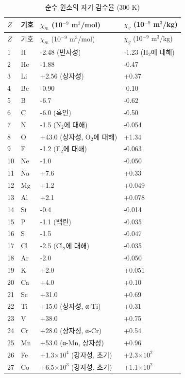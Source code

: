 \documentclass[12pt,a4paper]{article}
\begin{document}
	\begin{longtable}{p{0.6cm}p{1.2cm}p{2.5cm}p{2.5cm}}
		\caption{순수 원소의 자기 감수율 (300 K)} \label{tab:magnetic-susceptibility-all} \\
		\toprule
		\(Z\) & 기호 & \(\chi_m\) (10\(^{-9}\) m\(^3\)/mol) & \(\chi_g\) (10\(^{-9}\) m\(^3\)/kg) \\
		\midrule
		\endfirsthead
		\toprule
		\(Z\) & 기호 & \(\chi_m\) (10\(^{-9}\) m\(^3\)/mol) & \(\chi_g\) (10\(^{-9}\) m\(^3\)/kg) \\
		\midrule
		\endhead
		1  & H  & -2.48 (반자성) & -1.23 (H\(_2\)에 대해) \\
		2  & He & -1.88 & -0.47 \\
		3  & Li & +2.56 (상자성) & +0.37 \\
		4  & Be & -0.90 & -0.10 \\
		5  & B  & -6.7 & -0.62 \\
		6  & C  & -6.0 (흑연) & -0.50 \\
		7  & N  & -1.5 (N\(_2\)에 대해) & -0.054 \\
		8  & O  & +43.0 (상자성, O\(_2\)에 대해) & +1.34 \\
		9  & F  & -1.2 (F\(_2\)에 대해) & -0.063 \\
		10 & Ne & -1.0 & -0.050 \\
		11 & Na & +7.6 & +0.33 \\
		12 & Mg & +1.2 & +0.049 \\
		13 & Al & +2.1 & +0.078 \\
		14 & Si & -0.4 & -0.014 \\
		15 & P  & -1.1 (백린) & -0.035 \\
		16 & S  & -1.5 & -0.047 \\
		17 & Cl & -2.5 (Cl\(_2\)에 대해) & -0.035 \\
		18 & Ar & -2.0 & -0.050 \\
		19 & K  & +2.0 & +0.051 \\
		20 & Ca & +4.0 & +0.10 \\
		21 & Sc & +31.0 & +0.69 \\
		22 & Ti & +15.0 (상자성, α-Ti) & +0.31 \\
		23 & V  & +38.0 & +0.75 \\
		24 & Cr & +28.0 (상자성, α-Cr) & +0.54 \\
		25 & Mn & +53.0 (α-Mn, 상자성) & +0.96 \\
		26 & Fe & +1.3\(\times10^4\) (강자성, 초기) & +2.3\(\times10^2\) \\
		27 & Co & +6.5\(\times10^3\) (강자성, 초기) & +1.1\(\times10^2\) \\

\end{longtable}
\end{document}
